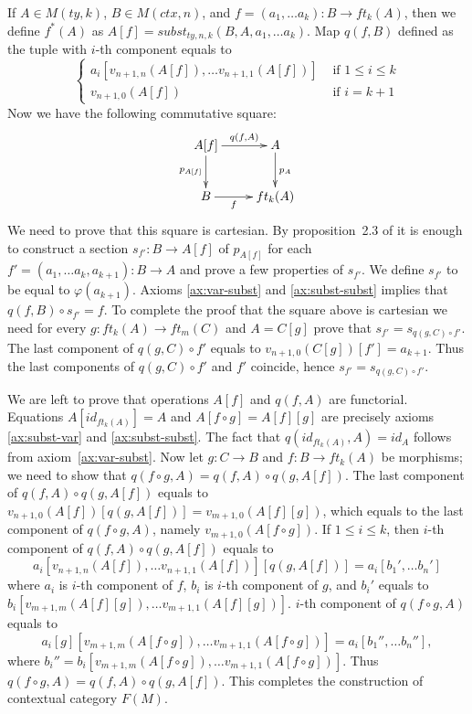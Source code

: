 \documentclass{elsarticle}
\theoremstyle{definition}
\theoremstyle{remark}
\numberwithin{figure}{section}
\begin{document}
If $A \in M(ty,k)$, $B \in M(ctx,n)$, and $f = (a_1, \ldots a_k) : B \to ft_k(A)$, then we define $f^*(A)$ as $A[f] = subst_{ty,n,k}(B, A, a_1, \ldots a_k)$.
Map $q(f,B)$ defined as the tuple with $i$-th component equals to
\[ \left\{
  \begin{array}{lr}
    a_i[v_{n+1,n}(A[f]), \ldots v_{n+1,1}(A[f])] & \text{ if } 1 \leq i \leq k \\
    v_{n+1,0}(A[f])                              & \text{ if } i = k+1
  \end{array}
\right. \]
Now we have the following commutative square:
\[ \xymatrix{ A[f] \ar[r]^-{q(f,A)} \ar[d]_{p_{A[f]}} & A \ar[d]^{p_A} \\
              B \ar[r]_-f                             & ft_k(A)
            } \]
We need to prove that this square is cartesian.
By proposition~2.3 of \cite{c-systems} it is enough to construct a section $s_{f'} : B \to A[f]$ of $p_{A[f]}$
    for each $f' = (a_1, \ldots a_k, a_{k+1}) : B \to A$ and prove a few properties of $s_{f'}$.
We define $s_{f'}$ to be equal to $\varphi(a_{k+1})$.
Axioms \eqref{ax:var-subst} and \eqref{ax:subst-subst} implies that $q(f,B) \circ s_{f'} = f$.
To complete the proof that the square above is cartesian we need for every $g : ft_k(A) \to ft_m(C)$ and $A = C[g]$ prove that $s_{f'} = s_{q(g,C) \circ f'}$.
The last component of $q(g,C) \circ f'$ equals to $v_{n+1,0}(C[g])[f'] = a_{k+1}$.
Thus the last components of $q(g,C) \circ f'$ and $f'$ coincide, hence $s_{f'} = s_{q(g,C) \circ f'}$.

We are left to prove that operations $A[f]$ and $q(f,A)$ are functorial.
Equations $A[id_{ft_k(A)}] = A$ and $A[f \circ g] = A[f][g]$ are precisely axioms \eqref{ax:subst-var} and \eqref{ax:subst-subst}.
The fact that $q(id_{ft_k(A)}, A) = id_A$ follows from axiom~\ref{ax:var-subst}.
Now let $g : C \to B$ and $f : B \to ft_k(A)$ be morphisms; we need to show that $q(f \circ g, A) = q(f,A) \circ q(g,A[f])$.
The last component of $q(f,A) \circ q(g,A[f])$ equals to $v_{n+1,0}(A[f])[q(g,A[f])] = v_{m+1,0}(A[f][g])$,
    which equals to the last component of $q(f \circ g, A)$, namely $v_{m+1,0}(A[f \circ g])$.
If $1 \leq i \leq k$, then $i$-th component of $q(f,A) \circ q(g,A[f])$ equals to
\[ a_i[v_{n+1,n}(A[f]), \ldots v_{n+1,1}(A[f])][q(g,A[f])] = a_i[b_1', \ldots b_n'] \]
where $a_i$ is $i$-th component of $f$, $b_i$ is $i$-th component of $g$, and $b_i'$ equals to $b_i[v_{m+1,m}(A[f][g]), \ldots v_{m+1,1}(A[f][g])]$.
$i$-th component of $q(f \circ g, A)$ equals to
\[ a_i[g][v_{m+1,m}(A[f \circ g]), \ldots v_{m+1,1}(A[f \circ g])] = a_i[b_1'', \ldots b_n''], \]
where $b_i'' = b_i[v_{m+1,m}(A[f \circ g]), \ldots v_{m+1,1}(A[f \circ g])]$.
Thus $q(f \circ g, A) = q(f,A) \circ q(g,A[f])$.
This completes the construction of contextual category $F(M)$.
\end{document}
